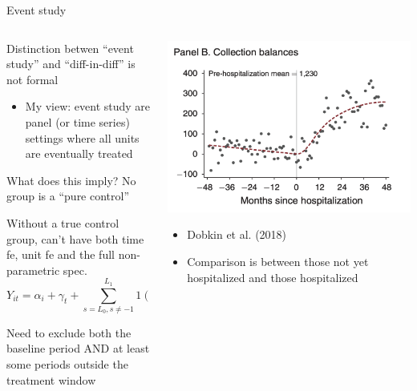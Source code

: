 \documentclass[notes,11pt, aspectratio=169]{beamer}
\newenvironment{wideitemize}{\itemize\addtolength{\itemsep}{10pt}}{\enditemize}
\begin{document}
\begin{frame}{Event study}
  \begin{columns}[T] %
    \begin{column}{0.6\textwidth}
      \begin{wideitemize}
      \item Distinction betwen ``event study'' and ``diff-in-diff'' is not formal
        \begin{itemize}
        \item My view: event study are panel (or time
          series) settings where all units are eventually treated
        \end{itemize}
      \item What does this imply? No group is a ``pure control''
      \item Without a true control group, can't have both time fe,
        unit fe and the full non-parametric spec. 
        \begin{equation*}
          Y_{it} = \alpha_{i} + \gamma_{t} + \sum_{s = L_{0}, s\not=-1}^{L_{1}}1(t-T_{i} = s)\mu_{s}
        \end{equation*}
        \vspace{-15pt}
        \item Need to exclude both the baseline period AND at least
          some periods outside the treatment window
        \end{wideitemize}
      \end{column}%
      \hfill%
      \begin{column}{.4\textwidth}
        \includegraphics[width=\linewidth]{images/noto1.png}\\
        \begin{itemize}
        \item Dobkin et al. (2018)
        \item Comparison is between those not yet hospitalized and those hospitalized
        \end{itemize}
      \end{column}%
    \end{columns}
  \end{frame}
\end{document}
